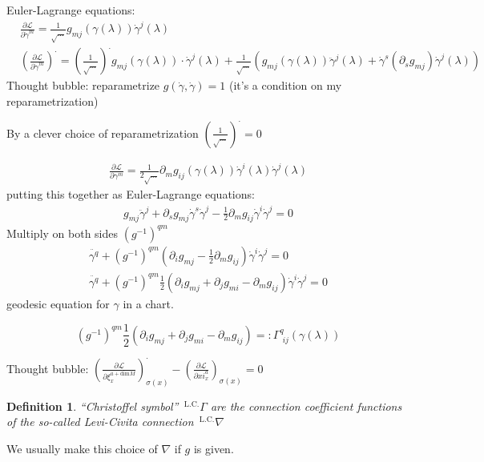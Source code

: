 \documentclass[10pt, twoside]{amsart}
\newtheorem{definition}{Definition}
\begin{document}
\begin{multicols*}{2}
Euler-Lagrange equations:
\[
\begin{aligned}
  & \frac{ \partial \mathcal{L}}{ \partial \dot{\gamma}^m } = \frac{1}{ \sqrt{  \dots } } g_{mj}(\gamma(\lambda)) \dot{\gamma}^j(\lambda) \\ 
  & \left( \frac{ \partial \mathcal{L}}{ \partial \dot{\gamma}^m } \right)^{\cdot} = \left( \frac{1}{ \sqrt{ \dots } } \right)^{\cdot} g_{mj}(\gamma(\lambda)) \cdot \dot{\gamma}^j(\lambda) + \frac{1}{\sqrt{ \dots }} \left( g_{mj}(\gamma(\lambda)) \ddot{\gamma}^j(\lambda) + \dot{\gamma}^s(\partial_s g_{mj}) \dot{\gamma}^j(\lambda) \right)
\end{aligned}
\]
Thought bubble: reparametrize $g(\dot{\gamma}, \dot{\gamma})=1$ (it's a condition on my reparametrization)

By a clever choice of reparametrization $( \frac{1}{\sqrt{ \dots }} )^{\cdot} =0$

\[
\begin{gathered}
  \frac{ \partial \mathcal{L}}{ \partial \gamma^m} = \frac{1}{ 2\sqrt{ \dots }} \partial_m g_{ij}(\gamma(\lambda)) \dot{\gamma}^i(\lambda) \dot{\gamma}^j(\lambda)
\end{gathered}
\]
putting this together as Euler-Lagrange equations:
\[
\begin{gathered}
g_{mj} \ddot{\gamma}^j +   \partial_s g_{mj} \dot{\gamma}^s \dot{\gamma}^j - \frac{1}{2} \partial_m g_{ij} \dot{\gamma}^i \dot{\gamma}^j = 0 
\end{gathered}
\]
Multiply on both sides $(g^{-1})^{qm}$
\[
\begin{gathered}
\ddot{\gamma^q} + (g^{-1})^{qm}(\partial_i g_{mj} - \frac{1}{2} \partial_m g_{ij} ) \dot{\gamma}^i \dot{\gamma}^j = 0  \\ 
\boxed{ \ddot{\gamma^q} + (g^{-1})^{qm}\frac{1}{2} (\partial_i g_{mj} + \partial_j g_{mi} -  \partial_m g_{ij} ) \dot{\gamma}^i \dot{\gamma}^j = 0 }
\end{gathered}
\]
geodesic equation for $\gamma$ in a chart.  

\[
\boxed{ (g^{-1})^{qm}\frac{1}{2} (\partial_i g_{mj} + \partial_j g_{mi} -  \partial_m g_{ij} ) =: \Gamma^q_{ \,\, ij}(\gamma(\lambda))
}
\]

Thought bubble: $\left( \frac{ \partial \mathcal{L}}{ \partial \xi_x^{a+\text{dim}M } } \right)^{\cdot}_{\sigma(x)} - \left( \frac{ \partial \mathcal{L}}{ \partial xi^a_x } \right)_{\sigma(x)} = 0$

\begin{definition}
``Christoffel symbol''   ${\,}^{\text{L.C.}}\Gamma$ are the connection coefficient functions of the so-called Levi-Civita connection ${\,}^{\text{L.C.}}\nabla$
\end{definition}
We usually make this choice of $\nabla$ if $g$ is given.  


\end{multicols*}
\end{document}

